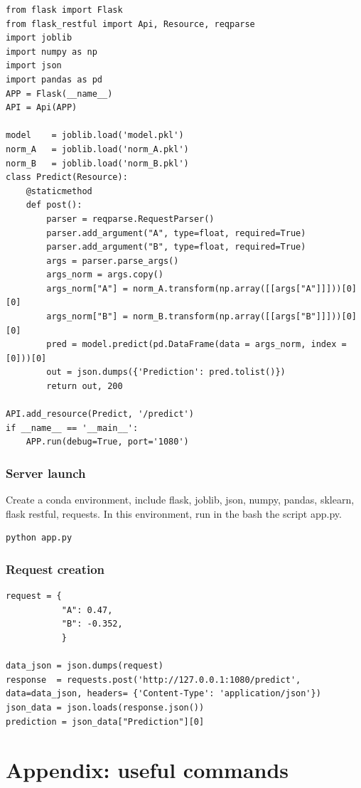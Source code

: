 \documentclass[24pt]{article}
\begin{document}
\begin{lstlisting}
from flask import Flask
from flask_restful import Api, Resource, reqparse
import joblib
import numpy as np
import json
import pandas as pd
APP = Flask(__name__)
API = Api(APP)

model    = joblib.load('model.pkl')
norm_A   = joblib.load('norm_A.pkl')
norm_B   = joblib.load('norm_B.pkl')
class Predict(Resource):
    @staticmethod
    def post():
        parser = reqparse.RequestParser()
        parser.add_argument("A", type=float, required=True)
        parser.add_argument("B", type=float, required=True)
        args = parser.parse_args()
        args_norm = args.copy()
        args_norm["A"] = norm_A.transform(np.array([[args["A"]]]))[0][0]
        args_norm["B"] = norm_B.transform(np.array([[args["B"]]]))[0][0]
        pred = model.predict(pd.DataFrame(data = args_norm, index = [0]))[0]
        out = json.dumps({'Prediction': pred.tolist()})
        return out, 200

API.add_resource(Predict, '/predict')
if __name__ == '__main__':
    APP.run(debug=True, port='1080')
\end{lstlisting}

\subsubsection{Server launch}
Create a conda environment, include flask, joblib, json, numpy, pandas, sklearn, flask restful, requests. In this environment, run in the bash the script app.py.
\begin{lstlisting}
python app.py
\end{lstlisting}


\subsubsection{Request creation}


\begin{lstlisting}
request = {
           "A": 0.47,
           "B": -0.352,
           }

data_json = json.dumps(request)
response  = requests.post('http://127.0.0.1:1080/predict', data=data_json, headers= {'Content-Type': 'application/json'})
json_data = json.loads(response.json())
prediction = json_data["Prediction"][0]
\end{lstlisting}


\section{Appendix: useful commands}
\end{document}

